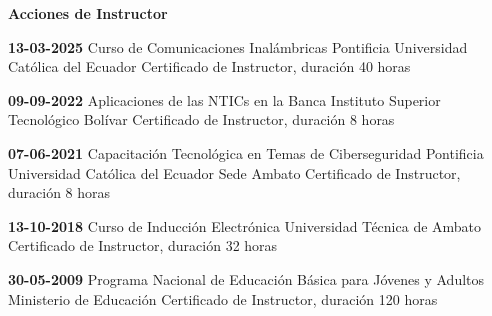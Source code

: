 \pagestyle{empty}
\begin{mainbar}
    \textbf{Acciones de Instructor}
\end{mainbar}

\begin{devent}
    \cvevent
    {\textbf{13-03-2025}}
	{Curso de Comunicaciones Inalámbricas}
	{Pontificia Universidad Católica del Ecuador}
	{Certificado de Instructor, duración 40 horas}
	{}
\end{devent}



\begin{devent}
    \cvevent
    {\textbf{09-09-2022}}
	{Aplicaciones de las NTICs en la Banca}
	{Instituto Superior Tecnológico Bolívar}
	{Certificado de Instructor, duración 8 horas}
	{}
\end{devent}
\begin{levent}
    \cvevent
	{\textbf{07-06-2021}}
	{Capacitación Tecnológica en Temas de Ciberseguridad}
	{Pontificia Universidad Católica del Ecuador Sede Ambato}
	{Certificado de Instructor, duración 8 horas}
	{}
\end{levent}
\begin{devent}
    \cvevent
	{\textbf{13-10-2018}}
	{Curso de Inducción Electrónica}
	{Universidad Técnica de Ambato}
	{Certificado de Instructor, duración 32 horas}
	{}
\end{devent}

\begin{levent}
    \cvevent
    {\textbf{30-05-2009}}
	{Programa Nacional de Educación Básica para Jóvenes y Adultos}
	{Ministerio de Educación}
	{Certificado de Instructor, duración 120 horas}
	{}
\end{levent}

\newpage
\setlength{\headheight}{15pt}
\pagestyle{fancy}
\fancyhf{}
\rhead[Ponencias]{\rightmark}
\lfoot[\thepage]{}
\rfoot[]{\thepage}

